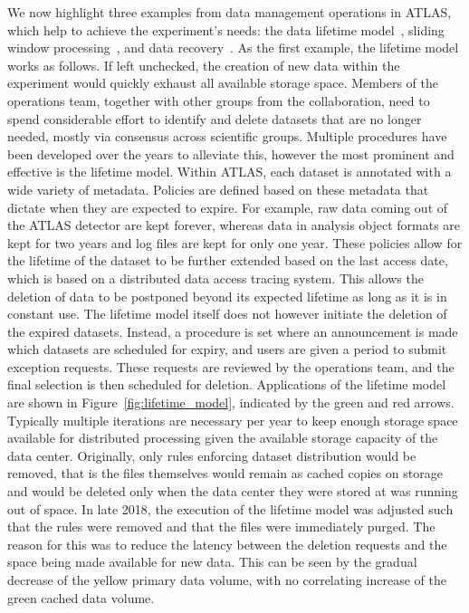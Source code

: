 \documentclass[11pt]{article}
\begin{document}
We now highlight three examples from data management operations in ATLAS, which help to achieve the experiment's needs: the data lifetime model~\cite{lifetime}, sliding window processing~\cite{carousel}, and data recovery~\cite{rucio}. As the first example, the lifetime model works as follows. If left unchecked, the creation of new data within the experiment would quickly exhaust all available storage space. Members of the operations team, together with other groups from the collaboration, need to spend considerable effort to identify and delete datasets that are no longer needed, mostly via consensus across scientific groups. Multiple procedures have been developed over the years to alleviate this, however the most prominent and effective is the lifetime model. Within ATLAS, each dataset is annotated with a wide variety of metadata. Policies are defined based on these metadata that dictate when they are expected to expire. For example, raw data coming out of the ATLAS detector are kept forever, whereas data in analysis object formats are kept for two years and log files are kept for only one year. These policies allow for the lifetime of the dataset to be further extended based on the last access date, which is based on a distributed data access tracing system. This allows the deletion of data to be postponed beyond its expected lifetime as long as it is in constant use. The lifetime model itself does not however initiate the deletion of the expired datasets. Instead, a procedure is set where an announcement is made which datasets are scheduled for expiry, and users are given a period to submit exception requests. These requests are reviewed by the operations team, and the final selection is then scheduled for deletion. Applications of the lifetime model are shown in Figure~\ref{fig:lifetime_model}, indicated by the green and red arrows. Typically multiple iterations are necessary per year to keep enough storage space available for distributed processing given the available storage capacity of the data center. Originally, only rules enforcing dataset distribution would be removed, that is the files themselves would remain as cached copies on storage and would be deleted only when the data center they were stored at was running out of space. In late 2018, the execution of the lifetime model was adjusted such that the rules were removed and that the files were immediately purged. The reason for this was to reduce the latency between the deletion requests and the space being made available for new data. This can be seen by the gradual decrease of the yellow primary data volume, with no correlating increase of the green cached data volume.
\end{document}
